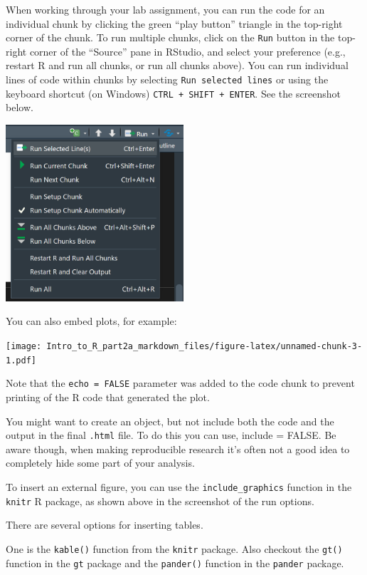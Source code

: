 \documentclass[
]{article}
\begin{document}
When working through your lab assignment, you can run the code for an
individual chunk by clicking the green ``play button'' triangle in the
top-right corner of the chunk. To run multiple chunks, click on the
\texttt{Run} button in the top-right corner of the ``Source'' pane in
RStudio, and select your preference (e.g., restart R and run all chunks,
or run all chunks above). You can run individual lines of code within
chunks by selecting \texttt{Run\ selected\ lines} or using the keyboard
shortcut (on Windows) \texttt{CTRL\ +\ SHIFT\ +\ ENTER}. See the
screenshot below.

\begin{flushleft}\includegraphics[width=250px]{images/RMarkdown_run_chunk} \end{flushleft}

You can also embed plots, for example:

\texttt{[image: Intro\_to\_R\_part2a\_markdown\_files/figure-latex/unnamed-chunk-3-1.pdf]}

Note that the \texttt{echo\ =\ FALSE} parameter was added to the code
chunk to prevent printing of the R code that generated the plot.

You might want to create an object, but not include both the code and
the output in the final \texttt{.html} file. To do this you can use,
include = FALSE. Be aware though, when making reproducible research it's
often not a good idea to completely hide some part of your analysis.

To insert an external figure, you can use the \texttt{include\_graphics}
function in the \texttt{knitr} R package, as shown above in the
screenshot of the run options.

There are several options for inserting tables.

One is the \texttt{kable()} function from the \texttt{knitr} package.
Also checkout the \texttt{gt()} function in the \texttt{gt} package and
the \texttt{pander()} function in the \texttt{pander} package.
\end{document}
